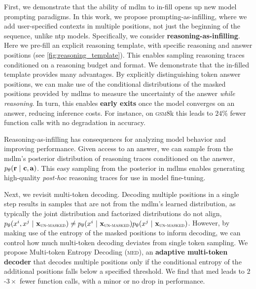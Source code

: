 First, we demonstrate that the ability of \gls{mdlm} to in-fill opens up new model prompting paradigms. In this work, we propose prompting-as-infilling, where we add user-specified contexts in multiple positions, not just the beginning of the sequence, unlike \gls{ntp} models. Specifically, we consider \textbf{{reasoning-as-infilling}}. Here we pre-fill an explicit reasoning template, with specific reasoning and answer positions (see \cref{fig:reasoning_template}).
This enables sampling reasoning traces conditioned on a reasoning budget and format. 
We demonstrate that the in-filled template provides many advantages. 
By explicitly distinguishing token answer positions, we can make use of the conditional distributions of the masked positions provided by \glspl{mdlm} to measure the uncertainty of the answer \textit{while reasoning}. In turn, this enables \textbf{early exits} once the model converges on an answer, reducing inference costs. For instance, on \textsc{gsm8}k this leads to $24\%$ fewer function calls with no degradation in accuracy. 

{{Reasoning-as-infilling}} has consequences for analyzing model behavior and improving performance. Given access to an answer, we can sample from the \gls{mdlm}'s posterior distribution of reasoning traces conditioned on the answer, $p_\theta(\mathbf{r} ~\vert~ \mathbf{c}, \mathbf{a})$. This easy sampling from the posterior in \glspl{mdlm} enables generating high-quality \textit{post-hoc} reasoning traces for use in model fine-tuning.

Next, we revisit multi-token decoding. Decoding multiple positions in a single step results in samples that are not from the \gls{mdlm}'s learned distribution, as typically the joint distribution and factorized distributions do not align, $p_\theta(x^i, x^j ~\vert~ \mathbf{x}_{\textsc{un-masked}}) \neq p_\theta(x^i ~\vert~ \mathbf{x}_{\textsc{un-masked}}) p_\theta(x^j ~\vert~ \mathbf{x}_{\textsc{un-masked}})$. However, by making use of the entropy of the masked positions to inform decoding, we can control how much multi-token decoding deviates from single token sampling. We propose Multi-token Entropy Decoding (\textsc{med}), an \textbf{adaptive multi-token decoder} that decodes multiple positions only if the conditional entropy of the additional positions falls below a specified threshold. We find that \gls{med} leads to $2$-$3\times$ fewer function calls, with a minor or no drop in performance. 



